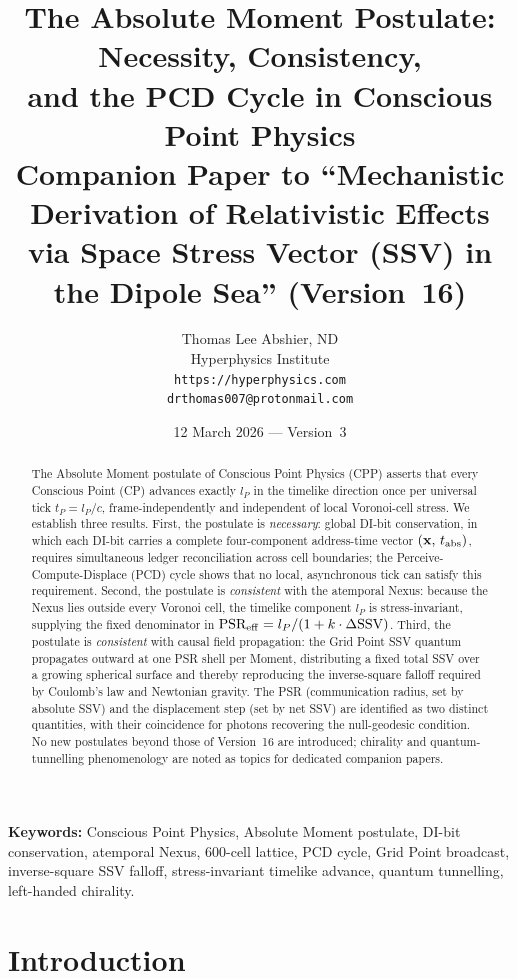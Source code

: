 \documentclass[12pt]{article}
\title{\textbf{The Absolute Moment Postulate: Necessity, Consistency,\\
and the PCD Cycle in Conscious Point Physics}\\[6pt]
{\large Companion Paper to ``Mechanistic Derivation of Relativistic Effects\\
via Space Stress Vector (SSV) in the Dipole Sea'' (Version~16)}}
\author{Thomas Lee Abshier, ND\\
Hyperphysics Institute\\
\texttt{https://hyperphysics.com}\\
\texttt{drthomas007@protonmail.com}}
\date{12 March 2026 --- Version~3}
\begin{document}
\maketitle

\noindent\textbf{Keywords:} Conscious Point Physics, Absolute Moment postulate,
DI-bit conservation, atemporal Nexus, 600-cell lattice, PCD cycle,
Grid Point broadcast, inverse-square SSV falloff, stress-invariant timelike
advance, quantum tunnelling, left-handed chirality.

\begin{abstract}
The Absolute Moment postulate of Conscious Point Physics (CPP) asserts that
every Conscious Point (CP) advances exactly $l_P$ in the timelike direction
once per universal tick $t_P = l_P/c$, frame-independently and independent of
local Voronoi-cell stress.  We establish three results.  First, the postulate
is \emph{necessary}: global DI-bit conservation, in which each DI-bit carries a
complete four-component address-time vector
$(\mathbf{x},\, t_{\rm abs})$, requires simultaneous ledger reconciliation
across cell boundaries; the Perceive-Compute-Displace (PCD) cycle shows that
no local, asynchronous tick can satisfy this requirement.  Second, the postulate
is \emph{consistent} with the atemporal Nexus: because the Nexus lies outside
every Voronoi cell, the timelike component $l_P$ is stress-invariant, supplying
the fixed denominator in $\text{PSR}_{\rm eff} = l_P/(1+k\cdot\Delta\text{SSV})$.
Third, the postulate is \emph{consistent} with causal field propagation: the
Grid Point SSV quantum propagates outward at one PSR shell per Moment,
distributing a fixed total SSV over a growing spherical surface and thereby
reproducing the inverse-square falloff required by Coulomb's law and
Newtonian gravity.  The PSR (communication radius, set by absolute SSV) and
the displacement step (set by net SSV) are identified as two distinct
quantities, with their coincidence for photons recovering the null-geodesic
condition.  No new postulates beyond those of Version~16 are introduced;
chirality and quantum-tunnelling phenomenology are noted as topics for
dedicated companion papers.
\end{abstract}

\section{Introduction}
\label{sec:intro}
\end{document}
